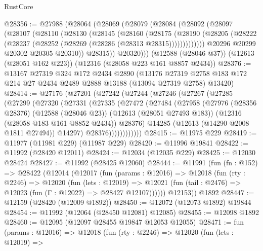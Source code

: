 \begin{lexlean}{RustCore}
\begin{coremodule}
@28356 := @27988
    (@28064
      (@28069
        (@28079
          (@28084
            (@28092
              (@28097
                (@28107
                  (@28110
                    (@28130
                      (@28145
                        (@28160
                          (@28175
                            (@28190
                              (@28205
                                (@28222 (@28237 (@28252 (@28269 (@28286 (@28313 @28315)))))))))))))
                  @20296
                  @20299
                  @20302
                  @20305
                  @20310))
              @28315))
          @20320)))
    (@12588 (@28046 @37))
    (@12613 (@28051 @162 @223))
    (@12316 (@28058 @223 @161 @8857 @2434))
@28376 := @13167
    @27319
    @324
    @172
    @2434
    @2890
    (@13176 @27319 @2758 @183 @172 @214 @27 @2434 @2489 @2888 @13188 (@13094 @27319 @2758) @13420)
@28414 := @27176
    (@27201
      (@27242
        (@27244
          (@27246
            (@27267
              (@27285
                (@27299
                  (@27320
                    (@27331
                      (@27335
                        (@27472
                          (@27484
                            (@27958
                              (@27976
                                (@28356 @28376)
                                (@12588 (@28046 @23))
                                (@12613 (@28051 @27493 @183))
                                (@12316 (@28058 @183 @161 @8852 @2434))
                                @28376)
                              @14285
                              (@12613 (@14290 @2008 @1811 @27494))
                              @14297)
                            @28376))))))))))))
@28415 := @11975 @229
@28419 := @11977 (@11981 @229) (@11987 @229)
@28420 := @11996 @19841
@28422 := @11992 (@28420 @12011)
@28424 := @12034 (@12035 @229)
@28425 := @12030 @28424
@28427 := @11992 (@28425 @12060)
@28444 := @11991
    (fun (fn : @152) =>
    @28422
      (@12014
        (@12017
          (fun (params : @12016) =>
          @12018
            (fun (rty : @2246) =>
            @12020
              (fun (lets : @12019) =>
              @12021 (fun (tail : @2476) => @12023 (fun (Γ : @12022) => @28427 @12107))))))
        @12153))
    @1892
@28447 := @12159 (@28420 (@12009 @1892))
@28450 := @12072 (@12073 @1892) @19844
@28454 := @11992 (@12064 (@28450 @12081) @12085)
@28455 := @12098 @1892
@28460 := @12095 (@12097 @28455 @19847 @12053 @12055)
@28471 := fun (params : @12016) =>
  @12018
    (fun (rty : @2246) =>
    @12020
      (fun (lets : @12019) =>

\end{coremodule}
\end{lexlean}
